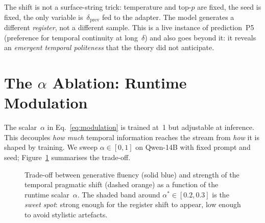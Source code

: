 \documentclass[10pt,twocolumn,letterpaper]{article}
\begin{document}
The shift is not a surface-string trick: temperature and top-$p$ are fixed, the seed is fixed, the only variable is~$\delta_{\text{prev}}$ fed to the adapter. The model generates a different \emph{register}, not a different sample. This is a live instance of prediction~P5 (preference for temporal continuity at long~$\delta$) and also goes beyond it: it reveals an \emph{emergent temporal politeness} that the theory did not anticipate.

\section{The $\alpha$ Ablation: Runtime Modulation}
\label{sec:alpha}

The scalar~$\alpha$ in Eq.~\ref{eq:modulation} is trained at~1 but adjustable at inference. This decouples \emph{how much} temporal information reaches the stream from \emph{how} it is shaped by training. We sweep $\alpha \in [0, 1]$ on Qwen-14B with fixed prompt and seed; Figure~\ref{fig:alpha} summarises the trade-off.

\begin{figure}[H]
\centering
{}
\caption{Trade-off between generative fluency (solid blue) and strength of the temporal pragmatic shift (dashed orange) as a function of the runtime scalar~$\alpha$. The shaded band around $\alpha^{*}\in[0.2,0.3]$ is the \emph{sweet spot}: strong enough for the register shift to appear, low enough to avoid stylistic artefacts.}
\label{fig:alpha}
\end{figure}
\end{document}
